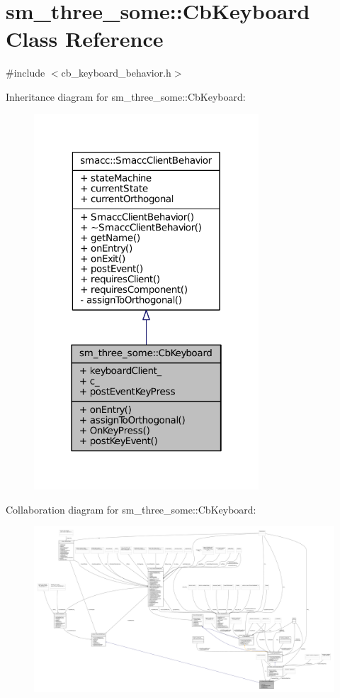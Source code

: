\hypertarget{classsm__three__some_1_1CbKeyboard}{}\section{sm\+\_\+three\+\_\+some\+:\+:Cb\+Keyboard Class Reference}
\label{classsm__three__some_1_1CbKeyboard}


{\ttfamily \#include $<$cb\+\_\+keyboard\+\_\+behavior.\+h$>$}



Inheritance diagram for sm\+\_\+three\+\_\+some\+:\+:Cb\+Keyboard\+:
\nopagebreak
\begin{figure}[H]
\begin{center}
\leavevmode
\includegraphics[width=238pt]{classsm__three__some_1_1CbKeyboard__inherit__graph}
\end{center}
\end{figure}


Collaboration diagram for sm\+\_\+three\+\_\+some\+:\+:Cb\+Keyboard\+:
\nopagebreak
\begin{figure}[H]
\begin{center}
\leavevmode
\includegraphics[width=350pt]{classsm__three__some_1_1CbKeyboard__coll__graph}
\end{center}
\end{figure}
